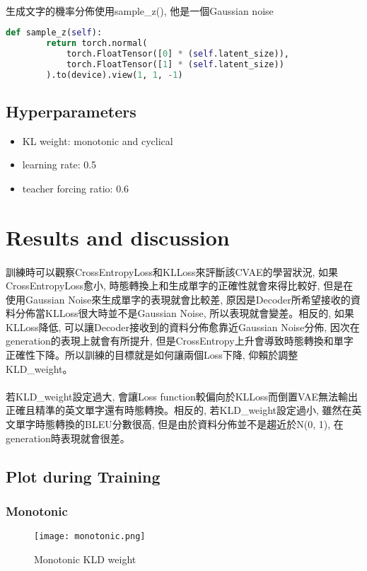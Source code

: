 \paragraph{}
生成文字的機率分佈使用sample\_z(), 他是一個Gaussian noise
\begin{lstlisting}[language=Python]
    def sample_z(self):
        return torch.normal(
            torch.FloatTensor([0] * (self.latent_size)),
            torch.FloatTensor([1] * (self.latent_size))
        ).to(device).view(1, 1, -1)
\end{lstlisting}
\subsection{Hyperparameters}
\begin{itemize}
\item KL weight: monotonic and cyclical
\item learning rate: 0.5
\item teacher forcing ratio: 0.6
\end{itemize}
\newpage
\section{Results and discussion}
\paragraph{}
訓練時可以觀察CrossEntropyLoss和KLLoss來評斷該CVAE的學習狀況, 如果CrossEntropyLoss愈小, 時態轉換上和生成單字的正確性就會來得比較好, 但是在使用Gaussian Noise來生成單字的表現就會比較差, 原因是Decoder所希望接收的資料分佈當KLLoss很大時並不是Gaussian Noise, 所以表現就會變差。相反的, 如果KLLoss降低, 可以讓Decoder接收到的資料分佈愈靠近Gaussian Noise分佈, 因次在generation的表現上就會有所提升, 但是CrossEntropy上升會導致時態轉換和單字正確性下降。所以訓練的目標就是如何讓兩個Loss下降, 仰賴於調整KLD\_weight。
\paragraph{}
若KLD\_weight設定過大, 會讓Loss function較偏向於KLLoss而倒置VAE無法輸出正確且精準的英文單字還有時態轉換。相反的, 若KLD\_weight設定過小, 雖然在英文單字時態轉換的BLEU分數很高, 但是由於資料分佈並不是趨近於N(0, 1), 在generation時表現就會很差。
\subsection{Plot during Training}
\subsubsection{Monotonic}
\begin{figure}[!ht]
    \begin{center} 
        \texttt{[image: monotonic.png]}
        \caption{Monotonic KLD weight}
    \end{center} 
\end{figure}

